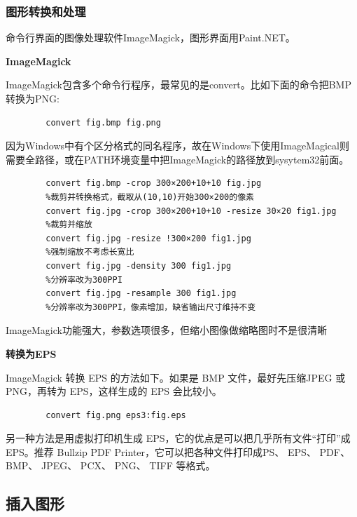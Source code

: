\documentclass[16pt]{article}
\begin{document}
    \subsubsection{图形转换和处理}
    命令行界面的图像处理软件ImageMagick，图形界面用Paint.NET。\par
    \textbf{ImageMagick} \par
    ImageMagick包含多个命令行程序，最常见的是convert。比如下面的命令把BMP转换为PNG: \par
    \begin{lstlisting}
        convert fig.bmp fig.png
    \end{lstlisting} \par
    因为Windows中有个区分格式的同名程序，故在Windows下使用ImageMagical则需要全路径，或在PATH环境变量中把ImageMagick的路径放到sysytem32前面。 \par
    \begin{lstlisting}
        convert fig.bmp -crop 300×200+10+10 fig.jpg
        %裁剪并转换格式，截取从(10,10)开始300×200的像素
        convert fig.jpg -crop 300×200+10+10 -resize 30×20 fig1.jpg
        %裁剪并缩放
        convert fig.jpg -resize !300×200 fig1.jpg
        %强制缩放不考虑长宽比
        convert fig.jpg -density 300 fig1.jpg
        %分辨率改为300PPI
        convert fig.jpg -resample 300 fig1.jpg
        %分辨率改为300PPI，像素增加，缺省输出尺寸维持不变
    \end{lstlisting} \par
    ImageMagick功能强大，参数选项很多，但缩小图像做缩略图时不是很清晰 \par
    \textbf{转换为EPS} \par
    ImageMagick 转换 EPS 的方法如下。如果是 BMP 文件，最好先压缩JPEG 或 PNG，再转为 EPS，这样生成的 EPS 会比较小。\par
    \begin{lstlisting}
        convert fig.png eps3:fig.eps
    \end{lstlisting} \par
    另一种方法是用虚拟打印机生成 EPS，它的优点是可以把几乎所有文件“打印”成 EPS。推荐 Bullzip PDF Printer，它可以把各种文件打印成PS、 EPS、 PDF、 BMP、 JPEG、 PCX、 PNG、 TIFF 等格式。

\subsection{插入图形}
\end{document}
